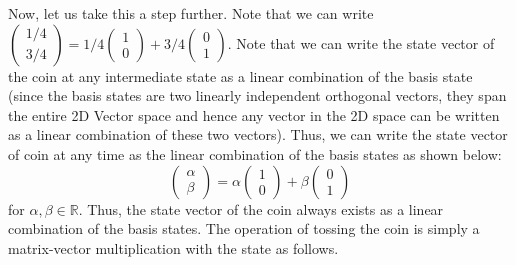 \documentclass[12pt, oneside]{book}
\theoremstyle{definition}
\theoremstyle{definition}
\theoremstyle{remark}
\begin{document}
Now, let us take this a step further. Note that we can write $\begin{pmatrix} 1/4 \\ 3/4 \end{pmatrix} = 1/4 \begin{pmatrix} 1 \\ 0 \end{pmatrix} + 3/4 \begin{pmatrix} 0 \\1\end{pmatrix}$. Note that we can write the state vector of the coin at any intermediate state as a linear combination of the basis state (since the basis states are two linearly independent orthogonal vectors, they span the entire 2D Vector space and hence any vector in the 2D space can be written as a linear combination of these two vectors). Thus, we can write the state vector of coin at any time as the linear combination of the basis states as shown below:
\[
\begin{pmatrix} \alpha \\ \beta \end{pmatrix} = \alpha \begin{pmatrix} 1 \\ 0 \end{pmatrix} + \beta \begin{pmatrix} 0 \\ 1 \end{pmatrix}
\]
for $\alpha, \beta \in \mathbb{R}$. Thus, the state vector of the coin always exists as a linear combination of the basis states. The operation of tossing the coin is simply a matrix-vector multiplication with the state as follows.
\end{document}
